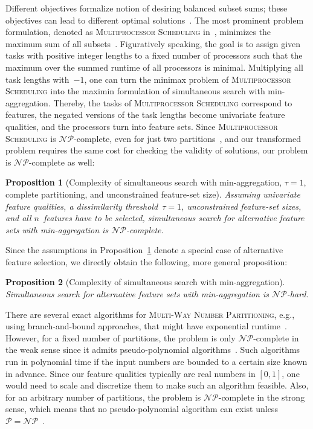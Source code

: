 \documentclass{article}
\newtheorem{proposition}{Proposition}
\theoremstyle{definition}
\begin{document}
Different objectives formalize notion of desiring balanced subset sums; these objectives can lead to different optimal solutions~\cite{korf2010objective, lawrinenko2017identical}.
The most prominent problem formulation, denoted as \textsc{Multiprocessor Scheduling} in~\cite{garey2003computers}, minimizes the maximum sum of all subsets~\cite{lawrinenko2018reduction, walter2017improved}.
Figuratively speaking, the goal is to assign given tasks with positive integer lengths to a fixed number of processors such that the maximum over the summed runtime of all processors is minimal.
Multiplying all task lengths with~$-1$, one can turn the minimax problem of \textsc{Multiprocessor Scheduling} into the maximin formulation of simultaneous search with min-aggregation.
Thereby, the tasks of \textsc{Multiprocessor Scheduling} correspond to features, the negated versions of the task lengths become univariate feature qualities, and the processors turn into feature sets. 
Since \textsc{Multiprocessor Scheduling} is $\mathcal{NP}$-complete, even for just two partitions~\cite{garey2003computers}, and our transformed problem requires the same cost for checking the validity of solutions, our problem is $\mathcal{NP}$-complete as well:
%
\begin{proposition}[Complexity of simultaneous search with min-aggregation, $\tau=1$, complete partitioning, and unconstrained feature-set size]
	Assuming univariate feature qualities, a dissimilarity threshold~$\tau = 1$, unconstrained feature-set sizes, and all $n$~features have to be selected, simultaneous search for alternative feature sets with min-aggregation is $\mathcal{NP}$-complete.
	\label{prop:afs:complexity-partitioning-min-unconstrained-k}
\end{proposition}
%
Since the assumptions in Proposition~\ref{prop:afs:complexity-partitioning-min-unconstrained-k} denote a special case of alternative feature selection, we directly obtain the following, more general proposition:
%
\begin{proposition}[Complexity of simultaneous search with min-aggregation]
	Simultaneous search for alternative feature sets with min-aggregation is $\mathcal{NP}$-hard.
	\label{prop:afs:complexity-sim}
\end{proposition}
%
There are several exact algorithms for \textsc{Multi-Way Number Partitioning}, e.g., using branch-and-bound approaches, that might have exponential runtime~\cite{haouari2008maximizing, schreiber2018optimal, walter2017improved}.
However, for a fixed number of partitions, the problem is only $\mathcal{NP}$-complete in the weak sense since it admits pseudo-polynomial algorithms~\cite{garey2003computers, korf2009multi}.
Such algorithms run in polynomial time if the input numbers are bounded to a certain size known in advance.
Since our feature qualities typically are real numbers in $[0,1]$, one would need to scale and discretize them to make such an algorithm feasible.
Also, for an arbitrary number of partitions, the problem is $\mathcal{NP}$-complete in the strong sense, which means that no pseudo-polynomial algorithm can exist unless $\mathcal{P}=\mathcal{NP}$~\cite{garey2003computers}.
\end{document}
